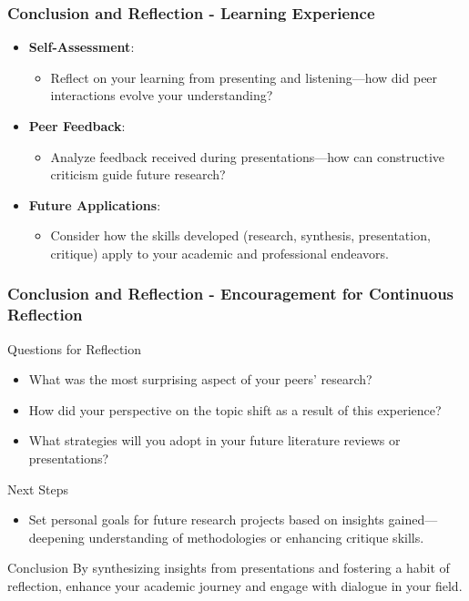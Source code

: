 \documentclass[aspectratio=169]{beamer}
\begin{document}
\begin{frame}[fragile]
    \frametitle{Conclusion and Reflection - Learning Experience}
    
    \begin{itemize}
        \item \textbf{Self-Assessment}:
        \begin{itemize}
            \item Reflect on your learning from presenting and listening—how did peer interactions evolve your understanding?
        \end{itemize}
        
        \item \textbf{Peer Feedback}:
        \begin{itemize}
            \item Analyze feedback received during presentations—how can constructive criticism guide future research?
        \end{itemize}
        
        \item \textbf{Future Applications}:
        \begin{itemize}
            \item Consider how the skills developed (research, synthesis, presentation, critique) apply to your academic and professional endeavors.
        \end{itemize}
    \end{itemize}
\end{frame}

\begin{frame}[fragile]
    \frametitle{Conclusion and Reflection - Encouragement for Continuous Reflection}
    
    \begin{block}{Questions for Reflection}
        \begin{itemize}
            \item What was the most surprising aspect of your peers’ research?
            \item How did your perspective on the topic shift as a result of this experience?
            \item What strategies will you adopt in your future literature reviews or presentations?
        \end{itemize}
    \end{block}

    \begin{block}{Next Steps}
        \begin{itemize}
            \item Set personal goals for future research projects based on insights gained—deepening understanding of methodologies or enhancing critique skills.
        \end{itemize}
    \end{block}

    \begin{block}{Conclusion}
        By synthesizing insights from presentations and fostering a habit of reflection, enhance your academic journey and engage with dialogue in your field.
    \end{block}
\end{frame}
\end{document}
